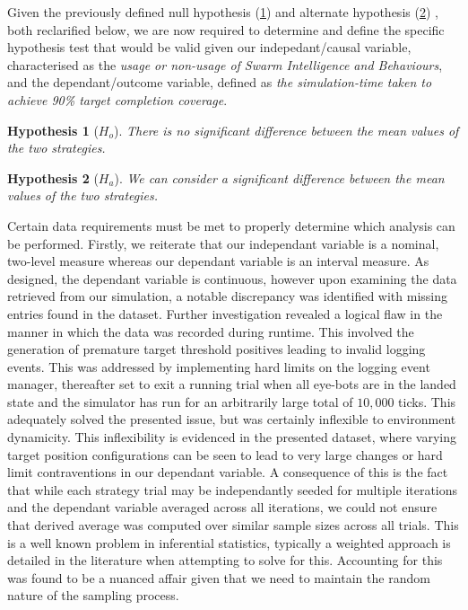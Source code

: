 \documentclass{report}
\newtheorem*{hyp}{Hypothesis}
\begin{document}
Given the previously defined null hypothesis (\ref{hyp:null2}) and alternate hypothesis (\ref{hyp:alt2}) , both reclarified below, we are now required to determine and define the specific hypothesis test that would be valid given our indepedant/causal variable, characterised as the \textit{usage or non-usage of Swarm Intelligence and Behaviours}, and the dependant/outcome variable, defined as \textit{the simulation-time taken to achieve 90\% target completion coverage}.

\begin{hyp}[$H_o$]\label{hyp:null2}
There is no significant difference between the mean values of the two strategies.
\end{hyp}

\begin{hyp}[$H_a$]\label{hyp:alt2}
We can consider a significant difference between the mean values of the two strategies.
\end{hyp}

Certain data requirements must be met to properly determine which analysis can be performed. Firstly, we reiterate that our independant variable is a nominal, two-level measure whereas our dependant variable is an interval measure. As designed, the dependant variable is continuous, however upon examining the data retrieved from our simulation, a notable discrepancy was identified with missing entries found in the dataset. Further investigation revealed a logical flaw in the manner in which the data was recorded during runtime. This involved the generation of premature target threshold positives leading to invalid logging events. This was addressed by implementing hard limits on the logging event manager, thereafter set to exit a running trial when all eye-bots are in the landed state and the simulator has run for an arbitrarily large total of $10,000$ ticks. This adequately solved the presented issue, but was certainly inflexible to environment dynamicity. This inflexibility is evidenced in the presented dataset, where varying target position configurations can be seen to lead to very large changes or hard limit contraventions in our dependant variable. A consequence of this is the fact that while each strategy trial may be independantly seeded for multiple iterations and the dependant variable averaged across all iterations, we could not ensure that derived average was computed over similar sample sizes across all trials. This is a well known problem in inferential statistics, typically a weighted approach is detailed in the literature when attempting to solve for this. Accounting for this was found to be a nuanced affair given that we need to maintain the random nature of the sampling process.
\end{document}
